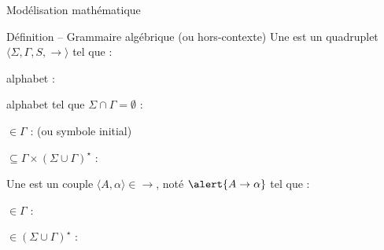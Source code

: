 
\begingroup

\begin{frame}{Modélisation mathématique}

  \begin{block}{Définition -- Grammaire algébrique (ou hors-contexte)}
    \vspace{2mm}
    Une  est un quadruplet \alert{$\langle \Sigma, \Gamma, S, \rightarrow \rangle$} tel que :
    \begin{description}[xxxx]
    \item[\alert{$\Sigma$}] alphabet : 
    \item[\alert{$\Gamma$}] alphabet tel que $\Sigma \cap \Gamma = \emptyset$ : 
    \item[\alert{$S$}] $\in \Gamma$ :  (ou symbole initial)
    \item[\alert{$\rightarrow$}] $\subseteq \Gamma \times (\Sigma \cup \Gamma)^\star$ : 
    \end{description}

    \vspace{3mm}
    Une  est un couple \alert{$\langle A, \alpha \rangle \in \rightarrow$}, noté $\alert{A \rightarrow \alpha}$ tel que :
    \begin{description}[xxxx]
    \item[\alert{$A$}] $\in \Gamma$ : 
    \item[\alert{$\alpha$}] $\in (\Sigma \cup \Gamma)^\star$ : 
    \end{description}
  \end{block}

\end{frame}

\endgroup
